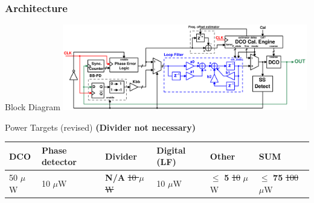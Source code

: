 \documentclass[t, screen, aspectratio=43]{beamer}
\begin{document}



\begin{frame}
	\frametitle{Architecture}
	\begin{block}{Block Diagram}
	\center\includegraphics[width=0.8\textwidth, angle=0]{pll_master_arch.pdf}

	\end{block}
		\begin{block}{Power Targets {\color{red}(revised)}}
		\scriptsize
		{\color{red}\textbf{(Divider not necessary)}}
		\vspace{-1em}
		\begin{table}[htb!]
			\tiny
			\centering
			\def\arraystretch{1.5}		
			\setlength\arrayrulewidth{0.75pt}
			\setlength{\tabcolsep}{1em} %
			\begin{tabular}{|l|l|l|l|l|l|}
				\hline 
				\rule[-1ex]{0pt}{2.5ex} \cellcolor{gray!40}\textbf{DCO} & \cellcolor{gray!40}\textbf{Phase detector} & \cellcolor{gray!40}\textbf{Divider }& \cellcolor{gray!40}\textbf{Digital (LF)}& \cellcolor{gray!40}\textbf{Other} & \cellcolor{gray!40}\textbf{SUM} \\ 
				\hline 
				\rule[-1ex]{0pt}{2.5ex} 50 $\mu$W& 10 $\mu$W & \textbf{N/A} {\color{red}\st{10 $\mu$W}} & 10 $\mu$W  & $\leq$ \textbf{5} {\color{red}\st{10}} $ \mu$W & $\leq$ \textbf{75} {\color{red}\st{100}} $\mu$W\\ 
				\hline 
			\end{tabular} 
		\end{table}   
	\end{block}

\end{frame}
\end{document}
